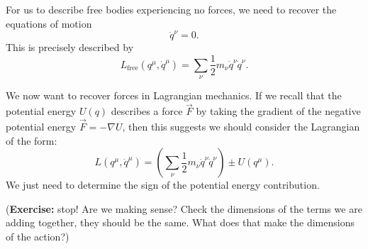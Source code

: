 For us to describe free bodies experiencing no forces, we need to
recover the equations of motion
\begin{equation}
\ddot{q}^{\nu} = 0.
\end{equation}
This is precisely described by
\begin{equation}
L_{\text{free}}(q^{\mu}, \dot{q}^{\mu}) = \sum_{\nu}\frac{1}{2}m_{\nu}\dot{q}^{\nu}\dot{q}^{\nu}.
\end{equation}

We now want to recover forces in Lagrangian mechanics. If we recall that
the potential energy $U(q)$ describes a force $\vec{F}$ by taking the
gradient of the negative potential energy $\vec{F}=-\nabla U$, then this
suggests we should consider the Lagrangian of the form:
\begin{equation}
L(q^{\mu}, \dot{q}^{\mu}) =
\left(\sum_{\nu}\frac{1}{2}m_{\nu}\dot{q}^{\nu}\dot{q}^{\nu}\right) \pm U(q^{\mu}).
\end{equation}
We just need to determine the sign of the potential energy contribution.

(\textbf{Exercise:} stop! Are we making sense? Check the dimensions of
the terms we are adding together, they should be the same. What does
that make the dimensions of the action?)

